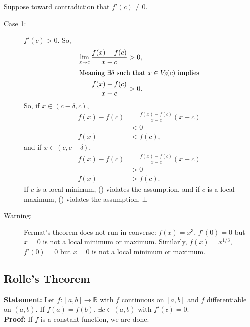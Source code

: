 \documentclass[10pt]{extarticle}
\newcommand{\R}{\mathbb{R}}
\begin{document}
    Suppose toward contradiction that $f'(c) \neq 0$.
    \begin{description}
      \item[Case 1:] $f'(c) > 0$. So,
        \begin{align*}
          \lim_{x\rightarrow c}\frac{f(x)-f(c)}{x-c} &> 0,\\
          \shortintertext{Meaning $\exists \delta$ such that $x\in \dot{V}_{\delta}(c)$ implies}
          \frac{f(x)-f(c)}{x-c} &> 0.
        \end{align*}
        So, if $x\in (c-\delta,c)$,
        \begin{align*}
          f(x)-f(c) &= \frac{f(x)-f(c)}{x-c}(x-c)\\
                    &< 0\\
          f(x) &< f(c), \tag*{(\textasteriskcentered)}
        \end{align*}
        and if $x\in (c,c+\delta)$,
        \begin{align*}
          f(x)-f(c) &= \frac{f(x)-f(c)}{x-c}(x-c)\\
                    &> 0\\
          f(x) &> f(c).\tag*{(\textasteriskcentered\textasteriskcentered)}
        \end{align*}
        If $c$ is a local minimum, (\textasteriskcentered) violates the assumption, and if $c$ is a local maximum, (\textasteriskcentered\textasteriskcentered) violates the assumption. $\bot$
    \end{description}
    \begin{description}
      \item[Warning:] Fermat's theorem does not run in converse: $f(x) = x^3$, $f'(0) = 0$ but $x=0$ is not a local minimum or maximum. Similarly, $f(x) = x^{1/3}$, $f'(0)= 0$ but $x=0$ is not a local minimum or maximum.
    \end{description}
  \subsection{Rolle's Theorem}%

   \textbf{Statement:} Let $f: [a,b]\rightarrow \R$ with $f$ continuous on $[a,b]$ and $f$ differentiable on $(a,b)$. If $f(a) = f(b)$, $\exists c\in (a,b)$ with $f'(c) = 0$.\\

    \textbf{Proof:} If $f$ is a constant function, we are done.\\
\end{document}
